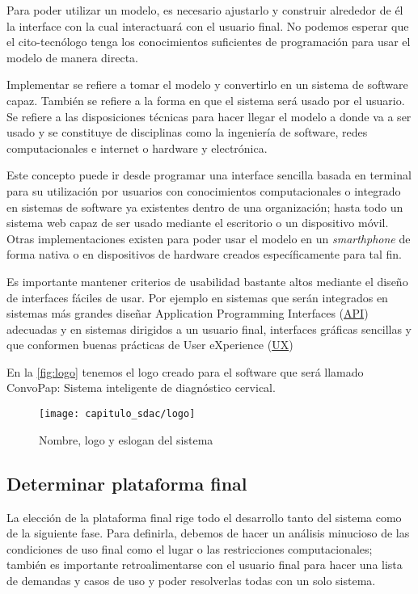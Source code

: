 Para poder utilizar un modelo, es necesario ajustarlo y construir alrededor de
él la interface con la cual interactuará con el usuario final. No podemos
esperar que el cito-tecnólogo tenga los conocimientos suficientes de
programación para usar el modelo de manera directa.

Implementar se refiere a tomar el modelo y convertirlo en un sistema de software
capaz. También se refiere a la forma en que el sistema será usado por el
usuario. Se refiere a las disposiciones técnicas para hacer llegar el modelo a
donde va a ser usado y se constituye de disciplinas como la ingeniería de
software, redes computacionales e internet o hardware y electrónica. 

Este concepto puede ir desde programar una interface sencilla basada en terminal
para su utilización por usuarios con conocimientos computacionales o integrado
en sistemas de software ya existentes dentro de una organización; hasta todo un
sistema web capaz de ser usado mediante el escritorio o un dispositivo móvil.
Otras implementaciones existen para poder usar el modelo en un
\emph{smarthphone} de forma nativa o en dispositivos de hardware creados
específicamente para tal fin.

Es importante mantener criterios de usabilidad bastante altos mediante el diseño
de interfaces fáciles de usar. Por ejemplo en sistemas que serán integrados en
sistemas más grandes diseñar Application Programming Interfaces
(\hyperlink{abbr}{API})
adecuadas y en sistemas dirigidos a un usuario final, interfaces gráficas
sencillas y que conformen buenas prácticas de User eXperience
(\hyperlink{abbr}{UX})

En la \autoref{fig:logo} tenemos el logo creado para el software que será
llamado ConvoPap: Sistema inteligente de diagnóstico cervical.

\begin{figure}[H]
    \centering
    \texttt{[image: capitulo\_sdac/logo]}
    \caption{Nombre, logo y eslogan del sistema}\label{fig:logo}
\end{figure}

\subsection{Determinar plataforma final}
La elección de la plataforma final rige todo el desarrollo tanto del sistema
como de la siguiente fase. Para definirla, debemos de hacer un análisis
minucioso de las condiciones de uso final como el lugar o las restricciones
computacionales; también es importante retroalimentarse con el usuario final
para hacer una lista de demandas y casos de uso y poder resolverlas todas con un
solo sistema.

